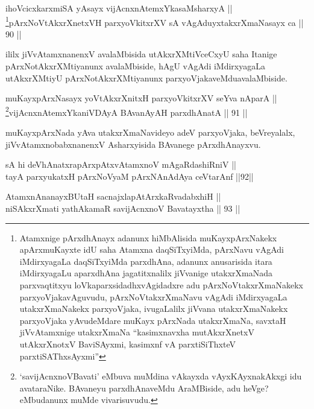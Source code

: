 \begin{shl}
ihoVcicxkarxmiSA yA\s sayx vijAcnxnAtemxYkasaMsharxyA || \\
\footnote{Atamxnige pArxdhAnayx adanunx hiMbAlisida muKayxpArxNakekx apArxmuKayxte idU saha Atamxna daqSiTxyiMda, pArxNavu vAgAdi iMdirxyagaLa daqSiTxyiMda parxdhAna, adanunx anusarisida itara iMdirxyagaLu aparxdhAna jagatitxnalilx jiVvanige utakxrXmaNada parxvaqtitxyu loVkaparxsidadhxvAgidadxre adu pArxNoVtakxrXmaNakekx parxyoVjakavAguvudu, pArxNoVtakxrXmaNavu vAgAdi iMdirxyagaLa utakxrXmaNakekx parxyoVjaka, ivugaLalilx jiVvana utakxrXmaNakekx parxyoVjaka yAvudeMdare muKayx pArxNada utakxrXmaNa, savxtaH jiVvAtamxnige utakxrXmaNa ``kasimxnavxha mutAkxrXnetxV utAkxrXnotxV BaviSAyxmi, kasimxnf vA parxtiSiThxteV parxtiSAThxsAyxmi''}pArxNoVtAkxrXnetxVH parxyoVkitxrXV sA vAgAduyxtakxrXmaNasayx ca \hfill || 90 ||
\end{shl}


\begin{artha}
ililx jiVvAtamxnanenxV avalaMbisida utAkxrXMtiVceCxyU saha Itanige
pArxNotAkxrXMtiyanunx avalaMbiside, hAgU vAgAdi iMdirxyagaLa
utAkxrXMtiyU pArxNotAkxrXMtiyanunx parxyoVjakaveMdu\break avalaMbiside.
\end{artha}

\begin{shl}
muKayxpArxNasayx yoVtAkxrXnitxH parxyoVkitxrXV seYva nAparA || \\
\footnote{`savijAcnxnoVBavati' eMbuva muMdina vAkayxda vAyxKAyxnakAkxgi idu avataraNike. BAvaneyu parxdhAnaveMdu AraMBiside, adu heVge? eMbudanunx muMde vivarisuvudu.}vijAcnxnAtemxYkaniVDAyA BAvanAyAH parxdhAnatA \hfill || 91 ||  
\end{shl}


\begin{artha}
muKayxpArxNada yAva utakxrXmaNavideyo adeV parxyoVjaka, beVreyalalx,
jiVvAtamxnobabxnanenxV Asharxyisida BAvanege pArxdhAnayxvu.
\end{artha}


\begin{shl}
sA hi deVhAnatxrapArxpAtxvAtamxnoV mAgaRdashiRniV || \\
tayA parxyukatxH pArxNoV\s yaM pArxNAnAdAya ceVtarAnf \hfill ||92||  
\end{shl}

\begin{shl}
AtamxnA\s nanayxBUtaH sacnajxlapAtArxkaRvadabxhiH || \\
niSAkxrXmati yathAkamaR savijAcnxnoV Bavatayxtha \hfill || 93 ||  
\end{shl}

